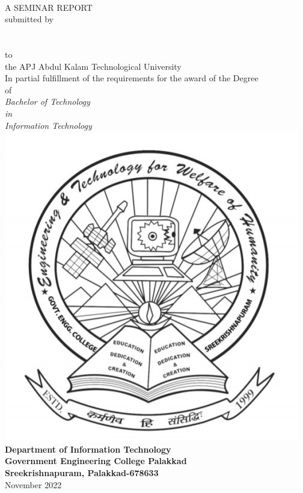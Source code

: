 \begin{titlepage}
  \begin{center}
    \textbf{\cTitle}\\
    \vfill
    A SEMINAR REPORT\\
    \vfill
    submitted by\\
    \vfill
    \textbf{
        \cName\\
        \cRegNo\\
    }
    \vfill
    to\\
    the APJ Abdul Kalam Technological University\\
    \vfill
    In partial fulfillment of the requirements for the award of the Degree\\
    of\\
    \emph{
        Bachelor of Technology\\
        in\\
        Information Technology
    }
    \vfill
    \includegraphics[scale=.3]{"covers/images/logoGecp.png"}
    \vfill
    \textbf{Department of Information Technology\\
      Government Engineering College Palakkad\\
      Sreekrishnapuram, Palakkad-678633}\\
    November 2022
  \end{center}
\end{titlepage}